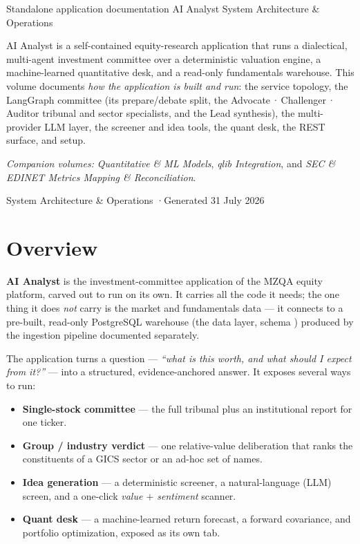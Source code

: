 \documentclass[11pt]{article}
\begin{document}
\mzqatitlepage
  {Standalone application documentation}
  {AI Analyst}
  {System Architecture \& Operations}
  {AI Analyst is a self-contained equity-research application that runs a
   dialectical, multi-agent investment committee over a deterministic valuation
   engine, a machine-learned quantitative desk, and a read-only fundamentals
   warehouse. This volume documents \emph{how the application is built and run}:
   the service topology, the LangGraph committee (its prepare/debate split, the
   Advocate\,·\,Challenger\,·\,Auditor tribunal and sector specialists, and the
   Lead synthesis), the multi-provider LLM layer, the screener and idea tools, the
   quant desk, the REST surface, and setup.

   \vspace{8pt}
   \textit{Companion volumes:} \emph{Quantitative \& ML Models},
   \emph{qlib Integration}, and \emph{SEC \& EDINET Metrics Mapping \&
   Reconciliation}.}
  {System Architecture \& Operations \quad·\quad Generated 31 July 2026}

\mzqatoc
\clearpage

\section{Overview}

\textbf{AI Analyst} is the investment-committee application of the MZQA equity
platform, carved out to run on its own. It carries all the code it needs; the one
thing it does \emph{not} carry is the market and fundamentals data --- it connects
to a pre-built, read-only PostgreSQL warehouse (the  data layer,
schema ) produced by the ingestion pipeline documented separately.

The application turns a question --- \emph{``what is this worth, and what should I
expect from it?''} --- into a structured, evidence-anchored answer. It exposes
several ways to run:

\begin{itemize}
  \item \textbf{Single-stock committee} --- the full tribunal plus an
        institutional report for one ticker.
  \item \textbf{Group / industry verdict} --- one relative-value deliberation that
        ranks the constituents of a GICS sector or an ad-hoc set of names.
  \item \textbf{Idea generation} --- a deterministic screener, a natural-language
        (LLM) screen, and a one-click \emph{value $+$ sentiment} scanner.
  \item \textbf{Quant desk} --- a machine-learned return forecast, a forward
        covariance, and portfolio optimization, exposed as its own tab.
\end{itemize}
\end{document}
